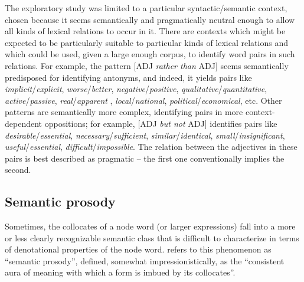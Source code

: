The exploratory study was limited to a particular syntactic/semantic context, chosen because it seems semantically and pragmatically neutral enough to allow all kinds of lexical relations to occur in it. There are contexts which might be expected to be particularly suitable to particular kinds of lexical relations and which could be used, given a large enough corpus, to identify word pairs in such relations. For example, the pattern [ADJ \textit{rather than} ADJ] seems semantically predisposed for identifying antonyms, and indeed, it yields pairs like \textit{implicit}/\textit{explicit}, \textit{worse}/\textit{better}, \textit{negative}/\textit{positive}, \textit{qualitative}/\textit{quantitative}, \textit{active}/\textit{passive}, \textit{real}/\textit{ap\-parent }, \textit{local}/\textit{national}, \textit{political}/\textit{economical}, etc. Other patterns are semantically more complex, identifying pairs in more context-dependent oppositions; for example, [ADJ \textit{but not} ADJ] identifies pairs like \textit{desirable}/\textit{essential}, \textit{necessary}/\textit{sufficient}, \textit{similar}/\textit{identical}, \textit{small}/\textit{insignificant}, \textit{useful}/\textit{essential}, \textit{difficult}/\textit{impossible}. The relation between the adjectives in these pairs is best described as pragmatic -- the first one conventionally implies the second.

\subsection{Semantic prosody}
\label{sec:semanticprosody}

Sometimes, the collocates of a node word (or larger expressions) fall into a more or less clearly recognizable semantic class that is difficult to characterize in terms of denotational properties of the node word. \citet[157]{louw_irony_1993} refers to this phenomenon as ``semantic prosody'', defined, somewhat impressionistically, as the ``consistent aura of meaning with which a form is imbued by its collocates''.


